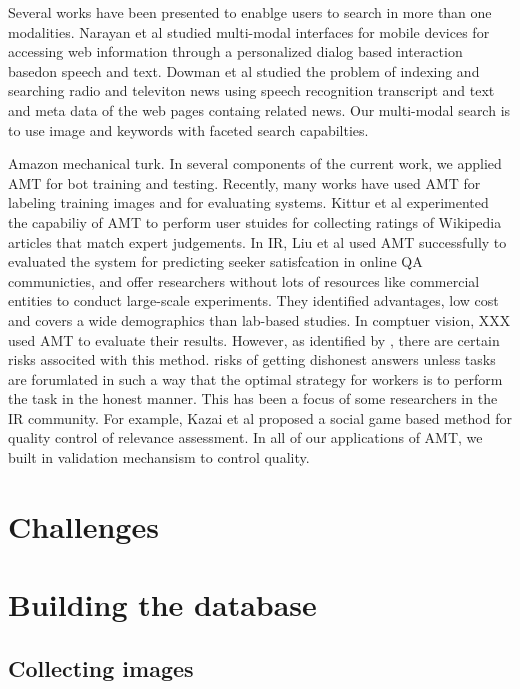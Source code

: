 \documentclass{www2010-submission}
\begin{document}
Several works have been presented to enablge users to search in more
than one modalities. Narayan et al \cite{Narayan} studied multi-modal
interfaces for mobile devices for accessing web information through a 
personalized dialog based interaction basedon speech and text. 
Dowman et al \cite{Dowman} studied the problem of indexing and
searching radio and televiton news using speech recognition transcript and text
and meta data of the web pages containg related news. Our multi-modal
search is to use image and keywords with faceted search capabilties.

Amazon mechanical turk. In several components of the current work, we
applied AMT for bot training and testing.  Recently, many works have
used AMT for labeling training images and for evaluating
systems. Kittur et al \cite{Kittur} experimented the capabiliy of AMT
to perform user stuides for collecting ratings of Wikipedia articles
that match expert judgements.  In IR, Liu et al \cite{Liu} used AMT
successfully to evaluated the system for predicting seeker
satisfcation in online QA communicties, and offer researchers without
lots of resources like commercial entities to conduct large-scale
experiments.  They identified advantages, low cost and covers a wide
demographics than lab-based studies.  In comptuer vision, XXX used AMT
to evaluate their results. However, as identified by \cite{Liu}, there
are certain risks associted with this method.  risks of getting
dishonest answers unless tasks are forumlated in such a way that the
optimal strategy for workers is to perform the task in the honest
manner. This has been a focus of some researchers in the IR
community. For example, Kazai et al \cite{Kazai} proposed a social
game based method for quality control of relevance assessment. In
all of our applications of AMT, we built in validation 
mechansism to control quality.



\section{Challenges}

\section{Building the database}

\subsection{Collecting images}
\end{document}
